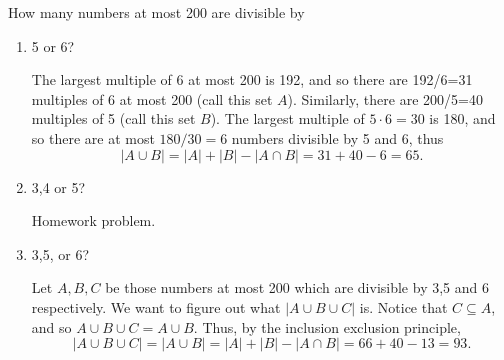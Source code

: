 \documentclass[11pt,dvipsnames]{book}
\numberwithin{equation}{section} %
\numberwithin{figure}{section} %
\numberwithin{table}{section} %
\begin{document}
\begin{exercise}
How many numbers at most 200 are divisible by 
\begin{enumerate}[label=(\alph*)]
\item 5 or 6?
\begin{solution}
The largest multiple of 6 at most 200 is 192, and so there are 192/6=31 multiples of 6 at most 200 (call this set $A$). Similarly, there are 200/5=40 multiples of 5 (call this set $B$). The largest multiple of $5\cdot 6=30$ is 180, and so there are at most $180/30=6$ numbers divisible by 5 and 6, thus
\[
|A\cup B| = |A|+|B|-|A\cap B| = 31+40-6 = 65.
\]
\end{solution}
\item 3,4 or 5?
\begin{solution}
Homework problem.
\end{solution}
\item 3,5, or 6?
\begin{solution}
Let $A,B,C$ be those numbers at most 200 which are divisible by 3,5 and 6 respectively. We want to figure out what $|A\cup B\cup C|$ is. Notice that $C\subseteq A$, and so $A\cup B\cup C = A\cup B$. Thus, by the inclusion exclusion principle,
\[
|A\cup B\cup C|=| A\cup B|=|A|+|B|-|A\cap B|
=66 + 40-13 = 93.
\]
\end{solution}
\end{enumerate}
\end{exercise}
\end{document}
